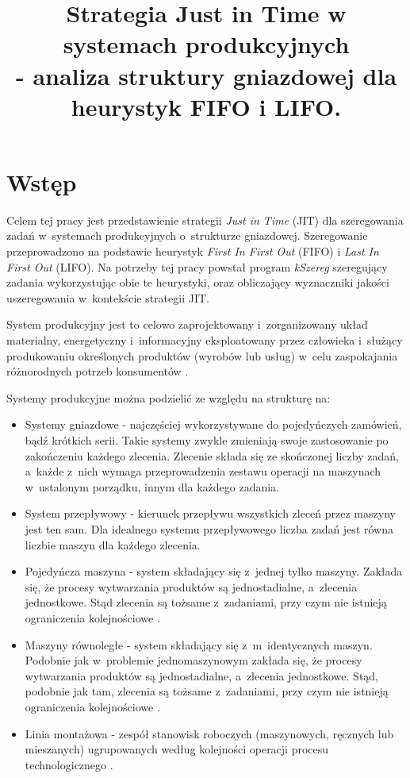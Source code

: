 \documentclass[twoside]{kInzynierka}
\title{Strategia Just in Time w systemach produkcyjnych\\ - analiza struktury gniazdowej dla heurystyk FIFO i LIFO.}
\begin{document}
\section        {Wstęp}
Celem tej pracy jest przedstawienie strategii \emph{Just in Time} (JIT) dla szeregowania zadań w~systemach produkcyjnych o~strukturze gniazdowej. Szeregowanie przeprowadzono na podstawie heurystyk \emph{First In First Out} (FIFO) i \emph{Last In First Out} (LIFO). Na potrzeby tej pracy powstał program \emph{kSzereg} szeregujący zadania wykorzystując obie te heurystyki, oraz obliczający wyznaczniki jakości uszeregowania w~kontekście strategii JIT.

System produkcyjny jest to celowo zaprojektowany i~zorganizowany układ materialny, energetyczny i~informacyjny eksploatowany przez człowieka i~służący produkowaniu określonych produktów (wyrobów lub usług) w~celu zaspokajania różnorodnych potrzeb konsumentów \cite{pastuszak}.

Systemy produkcyjne można podzielić ze względu na strukturę na:

\begin{itemize}
\item Systemy gniazdowe - najczęściej wykorzystywane do pojedyńczych zamówień, bądź krótkich serii. Takie systemy zwykle zmieniają swoje zastosowanie po zakończeniu każdego zlecenia. Zlecenie składa się ze skończonej liczby zadań, a~każde z~nich wymaga przeprowadzenia zestawu operacji na maszynach w~ustalonym porządku, innym dla każdego zadania.
\item System przepływowy - kierunek przepływu wszystkich zleceń przez maszyny jest ten sam. Dla idealnego systemu przepływowego liczba zadań jest równa liczbie maszyn dla każdego zlecenia. \cite{grzechca}
\item Pojedyńcza maszyna - system składający się z~jednej tylko maszyny. Zakłada się, że procesy wytwarzania produktów są jednostadialne, a~zlecenia jednostkowe. Stąd zlecenia są tożsame z~zadaniami, przy czym nie istnieją ograniczenia kolejnościowe \cite{grzechca}.
\item Maszyny równoległe - system składający się z~m~identycznych maszyn. Podobnie jak w~problemie jednomaszynowym zakłada się, że procesy wytwarzania produktów są jednostadialne, a~zlecenia jednostkowe. Stąd, podobnie jak tam, zlecenia są tożsame z~zadaniami, przy czym nie istnieją ograniczenia kolejnościowe \cite{grzechca}.
\item Linia montażowa -  zespół stanowisk roboczych (maszynowych, ręcznych lub mieszanych) ugrupowanych według kolejności operacji procesu technologicznego \cite{wiki}.
\end{itemize}
\end{document}
